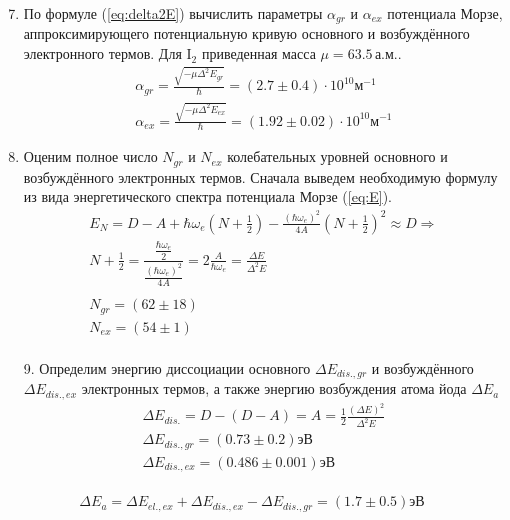 \documentclass[11.5pt,a4paper,russian]{article}
\begin{document}
\begin{enumerate}
  \setcounter{enumi}{6}
  \item По формуле (\eqref{eq:delta2E}) вычислить параметры $\alpha_{gr}$ и $\alpha_{ex}$ потенциала Морзе, аппроксимирующего потенциальную кривую основного и возбуждённого электронного термов. Для $\mathrm{I}_2$ приведенная масса $\mu = 63.5 \, \text{а.м.}$.\\
\begin{gather*}
  \alpha_{gr} = \frac{\sqrt{-\mu \Delta^2 E_{gr} }} {\hbar} = (2.7 \pm 0.4) \cdot 10^{10} \text{м}^{-1} \\ 
  \alpha_{ex} = \frac{\sqrt{-\mu \Delta^2 E_{ex} }} {\hbar} = (1.92 \pm 0.02) \cdot 10^{10} \text{м}^{-1}
\end{gather*}

  \item Оценим полное число $N_{gr}$ и $N_{ex}$ колебательных уровней основного и возбуждённого электронных термов. Сначала выведем необходимую формулу из вида энергетического спектра потенциала Морзе (\eqref{eq:E}).
\begin{gather*}
E_N = D-A + \hbar \omega_e \left(N+\frac12 \right) - \frac{(\hbar \omega_e)^2}{4A}\left(N+\frac12 \right)^2 \approx D \Rightarrow \\
N + \frac12 = \dfrac{
\frac{\hbar \omega_e}{2}}{\frac{(\hbar \omega_e)^2}{4A}} = 2 \frac{A}{\hbar \omega_e} = \frac{\Delta E}{\Delta^2 E} \\
\\
N_{gr} = (62 \pm 18) \\
N_{ex} = (54 \pm 1) \\
\end{gather*}

9. Определим энергию диссоциации основного $\Delta E_{d i s ., gr}$ и возбуждённого $\Delta E_{dis.,ex }$ электронных термов, а также энергию возбуждения атома йода $\Delta E_a$\\
\begin{gather*}
\Delta E_{dis.} = D - (D-A) = A = \frac12 \frac{(\Delta E)^2}{\Delta^2 E} \\
\Delta E_{d i s ., gr} = (0.73 \pm 0.2) \text{эВ} \\
\Delta E_{d i s ., ex} = (0.486 \pm 0.001) \text{эВ} \\
\end{gather*}

\end{enumerate}

$$
\Delta E_a = \Delta E_{el ., ex} + \Delta E_{d i s ., ex} - \Delta E_{d i s ., gr} = (1.7 \pm 0.5) \text{эВ}
$$
\end{document}
